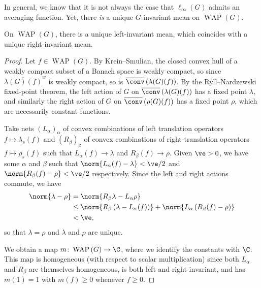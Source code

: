 \documentclass[10pt]{mypackage}
\begin{document}
In general, we know that it is not always the case that $\ell_{\infty}\left( G \right)$ admits an averaging function. Yet, there \textit{is} a unique $G$-invariant mean on $\operatorname{WAP}\left( G \right)$.
\begin{theorem}
  On $\operatorname{WAP}\left( G \right)$, there is a unique left-invariant mean, which coincides with a unique right-invariant mean.
\end{theorem}
\begin{proof}
  Let $f\in \operatorname{WAP}\left( G \right)$. By Krein--Smulian, the closed convex hull of a weakly compact subset of a Banach space is weakly compact, so since $ \overline{\lambda(G)(f)}^{w} $ is weakly compact, so is $ \overline{\conv}\left( \lambda(G)(f) \right) $. By the Ryll--Nardzewski fixed-point theorem, the left action of $G$ on $ \overline{\conv}\left( \lambda(G)(f) \right) $ has a fixed point $\lambda$, and similarly the right action of $G$ on $ \overline{\conv}\left( \rho(G)(f) \right) $ has a fixed point $\rho$, which are necessarily constant functions.

  Take nets $\left( L_{\alpha} \right)_{\alpha}$ of convex combinations of left translation operators $f\mapsto \lambda_s(f)$ and $\left( R_{\beta} \right)_{\beta}$ of convex combinations of right-translation operators $f\mapsto \rho_s(f)$ such that $L_{\alpha}(f)\rightarrow \lambda$ and $R_{\beta}(f)\rightarrow \rho$. Given $\ve > 0$, we have some $\alpha$ and $\beta$ such that $\norm{L_{\alpha}(f)-\lambda} < \ve/2$ and $\norm{R_{\beta}(f) - \rho} < \ve/2$ respectively. Since the left and right actions commute, we have
  \begin{align*}
    \norm{\lambda-\rho} &= \norm{R_{\beta}\lambda - L_{\alpha}\rho}\\
                        &\leq \norm{R_{\beta}\left( \lambda-L_{\alpha}(f) \right)} + \norm{L_{\alpha}\left( R_{\beta}(f)-\rho \right)}\\
                        &< \ve,
  \end{align*}
  so that $\lambda = \rho$ and $\lambda$ and $\rho$ are unique.

  We obtain a map $m\colon \operatorname{WAP}\left( G \right)\rightarrow \C$, where we identify the constants with $\C$. This map is homogeneous (with respect to scalar multiplication) since both $L_{\alpha}$ and $R_{\beta}$ are themselves homogeneous, is both left and right invariant, and has $m\left( 1 \right) = 1$ with $m\left( f \right)\geq 0$ whenever $f\geq 0$.


\end{proof}
\end{document}

